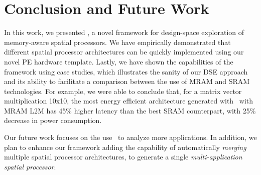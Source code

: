 \vspace{-1mm}
\section{Conclusion and Future Work}
In this work, we presented \frameworkname, a novel framework for design-space exploration of memory-aware spatial processors.
We have empirically demonstrated that different spatial processor architectures can be quickly implemented using our novel PE hardware template. Lastly, we have shown the capabilities of the framework using case studies, which illustrates the sanity of our DSE approach and its ability to facilitate a comparison between the use of MRAM and SRAM technologies.
For example, we were able to conclude that, for a matrix vector multiplication 10x10, the most energy efficient architecture generated with \frameworkname~with MRAM L2M has 45\% higher latency than the best SRAM counterpart, with 25\% decrease in power consumption.

Our future work focuses on the use \frameworkname~to analyze more applications. In addition, we plan to enhance our framework adding the capability of automatically \textit{merging} multiple spatial processor architectures, to generate a single \textit{multi-application spatial processor}.

\vspace{-2mm}
